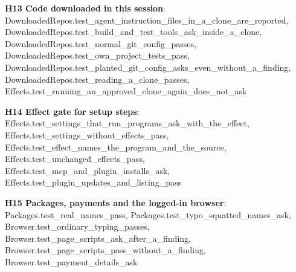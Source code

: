 \documentclass[10pt,a4paper]{article}
\begin{document}
\textbf{H13 Code downloaded in this session}: \textcolor{ok}{DownloadedRepos.\allowbreak{}test\_\allowbreak{}agent\_\allowbreak{}instruction\_\allowbreak{}files\_\allowbreak{}in\_\allowbreak{}a\_\allowbreak{}clone\_\allowbreak{}are\_\allowbreak{}reported}, \textcolor{ok}{DownloadedRepos.\allowbreak{}test\_\allowbreak{}build\_\allowbreak{}and\_\allowbreak{}test\_\allowbreak{}tools\_\allowbreak{}ask\_\allowbreak{}inside\_\allowbreak{}a\_\allowbreak{}clone}, \textcolor{ok}{DownloadedRepos.\allowbreak{}test\_\allowbreak{}normal\_\allowbreak{}git\_\allowbreak{}config\_\allowbreak{}passes}, \textcolor{ok}{DownloadedRepos.\allowbreak{}test\_\allowbreak{}own\_\allowbreak{}project\_\allowbreak{}tests\_\allowbreak{}pass}, \textcolor{ok}{DownloadedRepos.\allowbreak{}test\_\allowbreak{}planted\_\allowbreak{}git\_\allowbreak{}config\_\allowbreak{}asks\_\allowbreak{}even\_\allowbreak{}without\_\allowbreak{}a\_\allowbreak{}finding}, \textcolor{ok}{DownloadedRepos.\allowbreak{}test\_\allowbreak{}reading\_\allowbreak{}a\_\allowbreak{}clone\_\allowbreak{}passes}, \textcolor{ok}{Effects.\allowbreak{}test\_\allowbreak{}running\_\allowbreak{}an\_\allowbreak{}approved\_\allowbreak{}clone\_\allowbreak{}again\_\allowbreak{}does\_\allowbreak{}not\_\allowbreak{}ask}\par
\textbf{H14 Effect gate for setup steps}: \textcolor{ok}{Effects.\allowbreak{}test\_\allowbreak{}settings\_\allowbreak{}that\_\allowbreak{}run\_\allowbreak{}programs\_\allowbreak{}ask\_\allowbreak{}with\_\allowbreak{}the\_\allowbreak{}effect}, \textcolor{ok}{Effects.\allowbreak{}test\_\allowbreak{}settings\_\allowbreak{}without\_\allowbreak{}effects\_\allowbreak{}pass}, \textcolor{ok}{Effects.\allowbreak{}test\_\allowbreak{}effect\_\allowbreak{}names\_\allowbreak{}the\_\allowbreak{}program\_\allowbreak{}and\_\allowbreak{}the\_\allowbreak{}source}, \textcolor{ok}{Effects.\allowbreak{}test\_\allowbreak{}unchanged\_\allowbreak{}effects\_\allowbreak{}pass}, \textcolor{ok}{Effects.\allowbreak{}test\_\allowbreak{}mcp\_\allowbreak{}and\_\allowbreak{}plugin\_\allowbreak{}installs\_\allowbreak{}ask}, \textcolor{ok}{Effects.\allowbreak{}test\_\allowbreak{}plugin\_\allowbreak{}updates\_\allowbreak{}and\_\allowbreak{}listing\_\allowbreak{}pass}\par
\textbf{H15 Packages, payments and the logged-in browser}: \textcolor{ok}{Packages.\allowbreak{}test\_\allowbreak{}real\_\allowbreak{}names\_\allowbreak{}pass}, \textcolor{ok}{Packages.\allowbreak{}test\_\allowbreak{}typo\_\allowbreak{}squatted\_\allowbreak{}names\_\allowbreak{}ask}, \textcolor{ok}{Browser.\allowbreak{}test\_\allowbreak{}ordinary\_\allowbreak{}typing\_\allowbreak{}passes}, \textcolor{ok}{Browser.\allowbreak{}test\_\allowbreak{}page\_\allowbreak{}scripts\_\allowbreak{}ask\_\allowbreak{}after\_\allowbreak{}a\_\allowbreak{}finding}, \textcolor{ok}{Browser.\allowbreak{}test\_\allowbreak{}page\_\allowbreak{}scripts\_\allowbreak{}pass\_\allowbreak{}without\_\allowbreak{}a\_\allowbreak{}finding}, \textcolor{ok}{Browser.\allowbreak{}test\_\allowbreak{}payment\_\allowbreak{}details\_\allowbreak{}ask}\par
\end{document}
